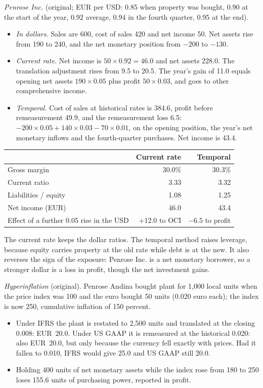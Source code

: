\begin{qfmethod}
\emph{Penrose Inc.} (original; EUR per USD: 0.85 when property was bought, 0.90 at the start of the year, 0.92 average, 0.94 in the fourth quarter, 0.95 at the end).
\begin{itemize}
\item \emph{In dollars.} Sales are 600, cost of sales 420 and net income 50. Net assets rise from 190 to 240, and the net monetary position from $-200$ to $-130$.
\item \emph{Current rate.} Net income is $50\times0.92=46.0$ and net assets 228.0. The translation adjustment rises from 9.5 to 20.5. The year's gain of 11.0 equals opening net assets $190\times0.05$ plus profit $50\times0.03$, and goes to other comprehensive income.
\item \emph{Temporal.} Cost of sales at historical rates is 384.6, profit before remeasurement 49.9, and the remeasurement loss 6.5: $-200\times0.05+140\times0.03-70\times0.01$, on the opening position, the year's net monetary inflows and the fourth-quarter purchases. Net income is 43.4.
\end{itemize}
\begin{center}\small
\begin{tabular}{@{}lrr@{}}
\toprule
 & Current rate & Temporal \\
\midrule
Gross margin & 30.0\% & 30.3\% \\
Current ratio & 3.33 & 3.32 \\
Liabilities / equity & 1.08 & 1.25 \\
Net income (EUR) & 46.0 & 43.4 \\
Effect of a further 0.05 rise in the USD & $+12.0$ to OCI & $-6.5$ to profit \\
\bottomrule
\end{tabular}
\end{center}
The current rate keeps the dollar ratios. The temporal method raises leverage, because equity carries property at the old rate while debt is at the new. It also reverses the sign of the exposure: Penrose Inc. is a net monetary borrower, so a stronger dollar is a loss in profit, though the net investment gains.

\emph{Hyperinflation} (original). Penrose Andina bought plant for 1,000 local units when the price index was 100 and the euro bought 50 units (0.020 euro each); the index is now 250, cumulative inflation of 150 percent.
\begin{itemize}
\item Under IFRS the plant is restated to 2,500 units and translated at the closing 0.008: EUR~20.0. Under US GAAP it is remeasured at the historical 0.020: also EUR~20.0, but only because the currency fell exactly with prices. Had it fallen to 0.010, IFRS would give 25.0 and US GAAP still 20.0.
\item Holding 400 units of net monetary assets while the index rose from 180 to 250 loses 155.6 units of purchasing power, reported in profit.
\end{itemize}


\end{qfmethod}
